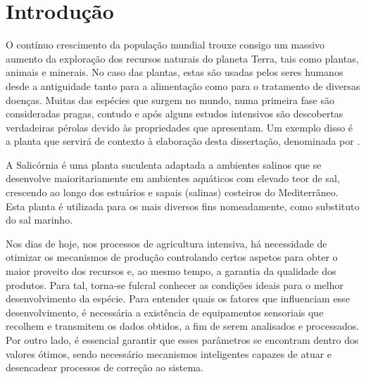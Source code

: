 \chapter{Introdução}



O contínuo crescimento da população mundial trouxe consigo um massivo aumento da exploração dos recursos naturais do planeta Terra, tais como plantas, animais e minerais. No caso das plantas, estas são usadas pelos seres humanos desde a antiguidade tanto para a alimentação como para o tratamento de diversas doenças. Muitas das espécies que surgem no mundo, numa primeira fase são consideradas pragas, contudo e após alguns estudos intensivos são descobertas verdadeiras pérolas devido às propriedades que apresentam. Um exemplo disso é a planta que servirá de contexto à elaboração desta dissertação, denominada por \sr. 









A Salicórnia é uma planta suculenta adaptada a ambientes salinos que se desenvolve maioritariamente em ambientes aquáticos com elevado teor de sal, crescendo ao longo dos estuários e sapais (salinas) costeiros do Mediterrâneo. Esta planta é utilizada para os mais diversos fins nomeadamente, como substituto do sal marinho. 


Nos dias de hoje, nos processos de agricultura intensiva, há necessidade de otimizar os mecanismos de produção controlando certos aspetos para obter o maior proveito dos recursos e, ao mesmo tempo, a garantia da qualidade dos produtos. Para tal, torna-se fulcral conhecer as condições ideais para o melhor desenvolvimento da espécie. Para entender quais os fatores que influenciam esse desenvolvimento, é necessária a existência de equipamentos sensoriais que recolhem e transmitem os dados obtidos, a fim de serem analisados e processados. Por outro lado, é essencial garantir que esses parâmetros se encontram dentro dos valores ótimos, sendo necessário mecanismos inteligentes capazes de atuar e desencadear processos de correção ao sistema. 


